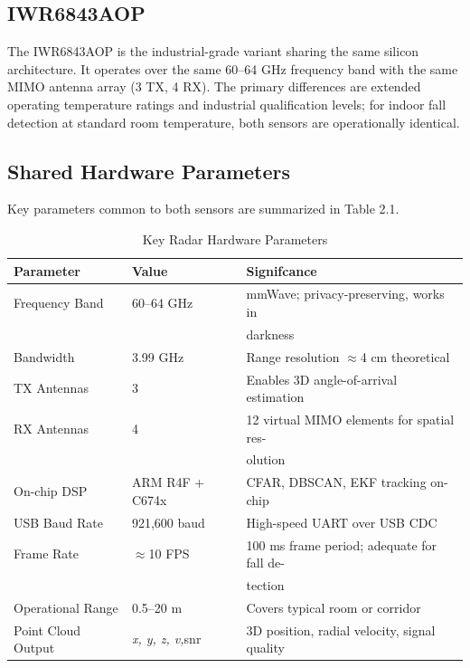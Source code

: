 \subsection{IWR6843AOP}

The IWR6843AOP is the industrial-grade variant sharing the same silicon architecture. It operates over the same 60--64 GHz frequency band with the same MIMO antenna array (3 TX, 4 RX). The primary differences are extended operating temperature ratings and industrial qualification levels; for indoor fall detection at standard room temperature, both sensors are operationally identical. 

\subsection{Shared Hardware Parameters}

Key parameters common to both sensors are summarized in Table 2.1.

\begin{table}[H]
\caption{Key Radar Hardware Parameters}
\label{tab:summary_1}
\centering
\begin{tabularx}{\textwidth}{@{} l X X @{}}
\toprule
\textbf{\textbf{Parameter}} & \textbf{\textbf{Value}} & \textbf{\textbf{Signifcance}} \\ \midrule
Frequency Band & 60--64 GHz & mmWave; privacy-preserving, works in \\
&  & darkness \\
Bandwidth & 3.99 GHz & Range resolution \textit{$\approx$}4 cm theoretical \\
TX Antennas & 3 & Enables 3D angle-of-arrival estimation \\
RX Antennas & 4 & 12 virtual MIMO elements for spatial res- \\
&  & olution \\
On-chip DSP & ARM R4F + C674x & CFAR, DBSCAN, EKF tracking on-chip \\
USB Baud Rate & 921,600 baud & High-speed UART over USB CDC \\
Frame Rate & \textit{$\approx$}10 FPS & 100 ms frame period; adequate for fall de- \\
&  & tection \\
Operational Range & 0.5--20 m & Covers typical room or corridor \\
Point Cloud Output & \textit{x, y, z, v,}snr & 3D position, radial velocity, signal quality \\ \bottomrule
\end{tabularx}
\end{table}





